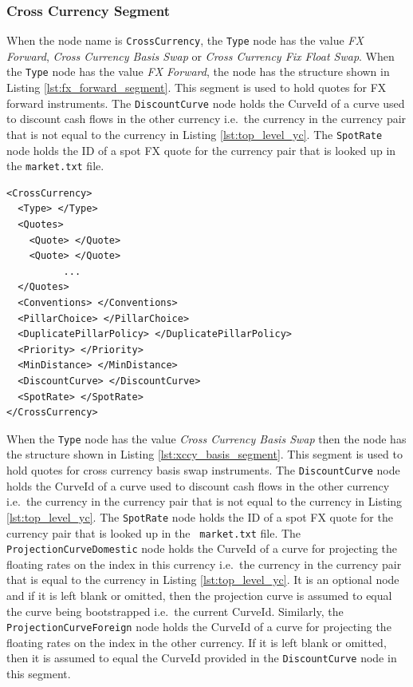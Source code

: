 \subsubsection*{Cross Currency Segment}
When the node name is \lstinline!CrossCurrency!, the \lstinline!Type! node has the value \emph{FX Forward}, \emph{Cross
Currency Basis Swap} or \emph{Cross Currency Fix Float Swap}. When the \lstinline!Type! node has the value \emph{FX
Forward}, the node has the structure shown in Listing \ref{lst:fx_forward_segment}. This segment is used to hold quotes
for FX forward instruments. The \lstinline!DiscountCurve! node holds the CurveId of a curve used to discount cash flows
in the other currency i.e.\ the currency in the currency pair that is not equal to the currency in Listing
\ref{lst:top_level_yc}. The \lstinline!SpotRate! node holds the ID of a spot FX quote for the currency pair that is
looked up in the {\tt market.txt} file.

\begin{listing}[H]
\begin{verbatim}
<CrossCurrency>
  <Type> </Type>
  <Quotes>
    <Quote> </Quote>
    <Quote> </Quote>
          ...
  </Quotes>
  <Conventions> </Conventions>
  <PillarChoice> </PillarChoice>
  <DuplicatePillarPolicy> </DuplicatePillarPolicy>
  <Priority> </Priority>
  <MinDistance> </MinDistance>
  <DiscountCurve> </DiscountCurve>
  <SpotRate> </SpotRate>
</CrossCurrency>
\end{verbatim}
\caption{FX forward yield curve segment}
\label{lst:fx_forward_segment}
\end{listing}

When the \lstinline!Type! node has the value \emph{Cross Currency Basis Swap} then the node has the structure shown in
Listing \ref{lst:xccy_basis_segment}. This segment is used to hold quotes for cross currency basis swap instruments. The
\lstinline!DiscountCurve! node holds the CurveId of a curve used to discount cash flows in the other currency i.e.\ the
currency in the currency pair that is not equal to the currency in Listing \ref{lst:top_level_yc}. The
\lstinline!SpotRate! node holds the ID of a spot FX quote for the currency pair that is looked up in the {\tt
  market.txt} file. The \lstinline!ProjectionCurveDomestic! node holds the CurveId of a curve for projecting the
floating rates on the index in this currency i.e.\ the currency in the currency pair that is equal to the currency in
Listing \ref{lst:top_level_yc}. It is an optional node and if it is left blank or omitted, then the projection curve is
assumed to equal the curve being bootstrapped i.e.\ the current CurveId. Similarly, the
\lstinline!ProjectionCurveForeign! node holds the CurveId of a curve for projecting the floating rates on the index in
the other currency. If it is left blank or omitted, then it is assumed to equal the CurveId provided in the
\lstinline!DiscountCurve! node in this segment.

